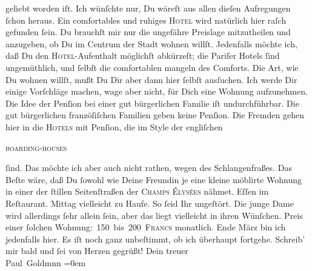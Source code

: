 \begin{ledgroupsized}[t]{13cm}
               geliebt worden iſt. {\pb}Ich wünſchte nur, Du wäreſt aus
               allen dieſen Aufregungen ſchon heraus.\pend
           \pstart
           Ein comfortables und ruhiges \textsc{Hotel} wird natürlich hier  raſch gefunden ſein. Du brauchſt mir nur die
               ungefähre  Preislage mitzutheilen und anzugeben,
               ob Du im Centrum der Stadt
               wohnen willſt. Jedenfalls möchte ich, daß Du den \textsc{Hotel}-Aufenthalt möglichſt abkürzeſt; die Pariſer Hotels ſind ungemüthlich, und ſelbſt die comfortablen mangeln des
               Comforts. Die Art, wie Du wohnen willſt, mußt Du Dir aber dann hier ſelbſt ausſuchen.
               Ich werde Dir einige Vorſchläge machen, wage aber nicht, für Dich {\pb}eine Wohnung aufzunehmen. Die Idee der Penſion bei
               einer gut bürgerlichen Familie iſt undurchführbar. Die gut bürgerlichen franzöſiſchen Familien geben
               keine Penſion. Die Fremden gehen hier in die \textsc{Hotels} mit
               Penſion, die im Style der engliſchen{ }\begin{otherlanguage}{english}\textsc{boarding-houses}\end{otherlanguage}{ }ſind. Das möchte ich aber auch nicht rathen, wegen
               des Schlangenfraßes. Das Beſte wäre, daß Du ſowohl wie Deine Freundin je eine kleine möblirte Wohnung in
               einer der ſtillen Seitenſtraßen der \textsc{Champs Élysées} nähmet. Eſſen im Reſtaurant. \strikeout{\textcolor{gray}{×}} Mittag vielleicht zu Haufe. {\pb}So ſeid Ihr
               ungeſtört. Die junge Dame
               wird allerdings ſehr allein ſein, aber das liegt vielleicht in ihren Wünſchen. Preis
               einer ſolchen Wohnung: 150 bis 200 \textsc{Francs} monatlich.\pend
           \pstart
            Ende März bin ich jedenfalls hier. Es iſt noch
               ganz unbeſtimmt, ob ich überhaupt fortgehe.\pend
           \pstart
           Schreib’ mir bald und ſei von Herzen gegrüßt!\pend
           \pstart
           Dein treuer {\\[\baselineskip]}\spacefill\mbox{Paul Goldmnn}\pend
           \leftskip=0em{}
         
         \endnumbering{}\end{ledgroupsized}  \newcommand{\dateiname}{L02804}\newcommand{\titel}{Paul Goldmann an Arthur Schnitzler, 24. 2. [1897]}\newcommand{\editorInnen}{Martin Anton Müller und Laura Untner}
      
